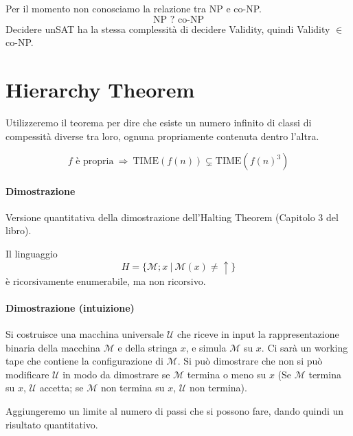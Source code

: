 Per il momento non conosciamo la relazione tra NP e co-NP.
$$
    \text{NP } ? \text{ co-NP}
$$
Decidere unSAT ha la stessa complessità di decidere Validity, quindi Validity $\in$ co-NP.



\section{Hierarchy Theorem}
Utilizzeremo il teorema per dire che esiste un numero infinito di classi di compessità diverse tra loro, ognuna propriamente contenuta dentro l'altra.

\begin{theorem}
    $$
        f \text{ è propria}
        ~\Rightarrow~
        \text{TIME}(f(n)) \subsetneq \text{TIME}(f(n)^3)
    $$
\end{theorem}
\paragraph{Dimostrazione} Versione quantitativa della dimostrazione dell'Halting Theorem (Capitolo 3 del libro).

\begin{theorem}
    Il linguaggio
    $$
        H = \{ \mathcal{M};x ~|~ \mathcal{M}(x)\neq\uparrow \}
    $$
    è ricorsivamente enumerabile, ma non ricorsivo.
\end{theorem}
\paragraph{Dimostrazione (intuizione)} Si costruisce una macchina universale $\mathcal{U}$ che riceve in input la rappresentazione binaria della macchina $\mathcal{M}$ e della stringa $x$, e simula $\mathcal{M}$ su $x$. Ci sarà un working tape che contiene la configurazione di $\mathcal{M}$. Si può dimostrare che non si può modificare $\mathcal{U}$ in modo da dimostrare se $\mathcal{M}$ termina o meno su $x$ (Se $\mathcal{M}$ termina su $x$, $\mathcal{U}$ accetta; se $\mathcal{M}$ non termina su $x$, $\mathcal{U}$ non termina). 

Aggiungeremo un limite al numero di passi che si possono fare, dando quindi un risultato quantitativo.



